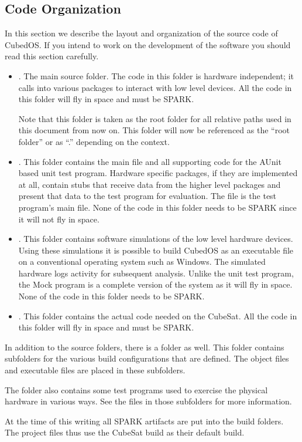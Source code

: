
\subsection{Code Organization}
\label{sec:architecture-code-organization}

In this section we describe the layout and organization of the source code of CubedOS. If you
intend to work on the development of the software you should read this section carefully.

\begin{itemize}

\item {}. The main source folder. The code in this folder is hardware independent;
  it calls into various packages to interact with low level devices. All the code in this folder
  will fly in space and must be SPARK.

  Note that this folder is taken as the root folder for all relative paths used in this document
  from now on. This folder will now be referenced as the ``root folder'' or as ``.'' depending
  on the context.

\item {}. This folder contains the main file and all supporting code for the AUnit
  based unit test program. Hardware specific packages, if they are implemented at all, contain
  stubs that receive data from the higher level packages and present that data to the test
  program for evaluation. The file  is the test program's main file. None of
  the code in this folder needs to be SPARK since it will not fly in space.

\item {}. This folder contains software simulations of the low level hardware
  devices. Using these simulations it is possible to build CubedOS as an executable file on a
  conventional operating system such as Windows. The simulated hardware logs activity for
  subsequent analysis. Unlike the unit test program, the Mock program is a complete version of
  the system as it will fly in space. None of the code in this folder needs to be SPARK.

\item {}. This folder contains the actual code needed on the CubeSat. All the
  code in this folder will fly in space and must be SPARK.

\end{itemize}

In addition to the source folders, there is a  folder as well. This folder
contains subfolders for the various build configurations that are defined. The object files and
executable files are placed in these subfolders.

The  folder also contains some test programs used to exercise the physical
hardware in various ways. See the  files in those subfolders for more
information.

At the time of this writing all SPARK artifacts are put into the  build
folders. The project files thus use the CubeSat build as their default build.
